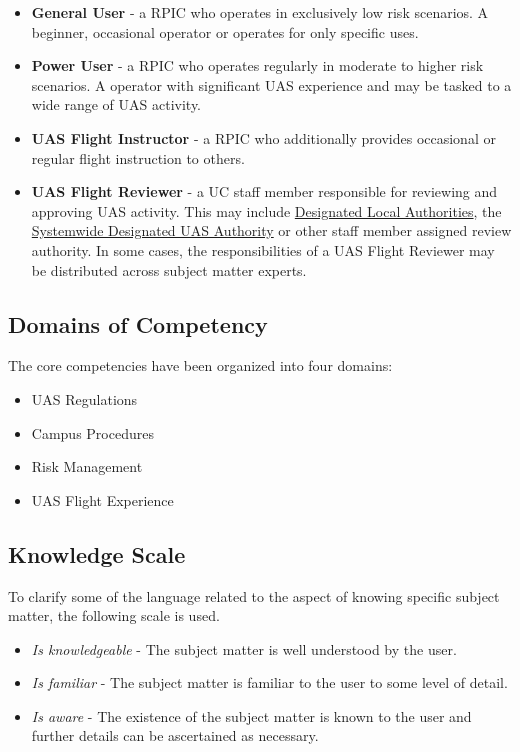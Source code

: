 \documentclass[
]{book}
\providecommand{\tightlist}{%
  \setlength{\itemsep}{0pt}\setlength{\parskip}{0pt}}
\begin{document}
\begin{itemize}
\tightlist
\item
  \textbf{General User} - a RPIC who operates in exclusively low risk scenarios. A beginner, occasional operator or operates for only specific uses.
\item
  \textbf{Power User} - a RPIC who operates regularly in moderate to higher risk scenarios. A operator with significant UAS experience and may be tasked to a wide range of UAS activity.
\item
  \textbf{UAS Flight Instructor} - a RPIC who additionally provides occasional or regular flight instruction to others.\\
\item
  \textbf{UAS Flight Reviewer} - a UC staff member responsible for reviewing and approving UAS activity. This may include \protect\hyperlink{DLA}{Designated Local Authorities}, the \protect\hyperlink{SDA}{Systemwide Designated UAS Authority} or other staff member assigned review authority. In some cases, the responsibilities of a UAS Flight Reviewer may be distributed across subject matter experts.
\end{itemize}

\hypertarget{domains-of-competency}{%
\subsection{Domains of Competency}\label{domains-of-competency}}

The core competencies have been organized into four domains:

\begin{itemize}
\tightlist
\item
  UAS Regulations
\item
  Campus Procedures
\item
  Risk Management
\item
  UAS Flight Experience
\end{itemize}

\hypertarget{knowledge-scale}{%
\subsection{Knowledge Scale}\label{knowledge-scale}}

To clarify some of the language related to the aspect of knowing specific subject matter, the following scale is used.

\begin{itemize}
\tightlist
\item
  \emph{Is knowledgeable} - The subject matter is well understood by the user.
\item
  \emph{Is familiar} - The subject matter is familiar to the user to some level of detail.
\item
  \emph{Is aware} - The existence of the subject matter is known to the user and further details can be ascertained as necessary.
\end{itemize}
\end{document}
